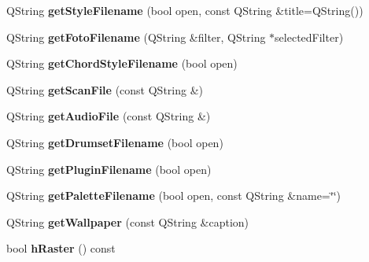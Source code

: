 \begin{DoxyCompactItemize}
Q\+String {\bfseries get\+Style\+Filename} (bool open, const Q\+String \&title=Q\+String())
\item 
\mbox{\label{class_ms_1_1_muse_score_a2ad055cc9be789eb83cb3cee7ca792bb}} 
Q\+String {\bfseries get\+Foto\+Filename} (Q\+String \&filter, Q\+String $\ast$selected\+Filter)
\item 
\mbox{\label{class_ms_1_1_muse_score_aa14c2863640732a77b37f9cd667937a0}} 
Q\+String {\bfseries get\+Chord\+Style\+Filename} (bool open)
\item 
\mbox{\label{class_ms_1_1_muse_score_a77cbb087b7553ebc3aae5efa2630207b}} 
Q\+String {\bfseries get\+Scan\+File} (const Q\+String \&)
\item 
\mbox{\label{class_ms_1_1_muse_score_a4261859a5a7553440458faf117cddb49}} 
Q\+String {\bfseries get\+Audio\+File} (const Q\+String \&)
\item 
\mbox{\label{class_ms_1_1_muse_score_ab3867db9b640b708a9d657e75ed241fc}} 
Q\+String {\bfseries get\+Drumset\+Filename} (bool open)
\item 
\mbox{\label{class_ms_1_1_muse_score_aa2cf3637a0cd544100725aaa1931da41}} 
Q\+String {\bfseries get\+Plugin\+Filename} (bool open)
\item 
\mbox{\label{class_ms_1_1_muse_score_a2dee87f790ebabffda2f0a7d40cc6071}} 
Q\+String {\bfseries get\+Palette\+Filename} (bool open, const Q\+String \&name=\char`\"{}\char`\"{})
\item 
\mbox{\label{class_ms_1_1_muse_score_ac73f1fb2dc7e4094e4f01d635ea8f0ca}} 
Q\+String {\bfseries get\+Wallpaper} (const Q\+String \&caption)
\item 
\mbox{\label{class_ms_1_1_muse_score_a7bcb34f02652429d109942b157756869}} 
bool {\bfseries h\+Raster} () const
\item 
\mbox{\label{class_ms_1_1_muse_score_af21717baf5c175c6d716b1d2f5d0d2b9}} 

\end{DoxyCompactItemize}
